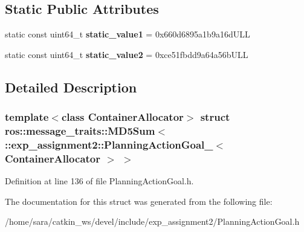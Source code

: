 \subsection*{Static Public Attributes}
\begin{DoxyCompactItemize}
\item 
\mbox{\label{structros_1_1message__traits_1_1MD5Sum_3_01_1_1exp__assignment2_1_1PlanningActionGoal___3_01ContainerAllocator_01_4_01_4_a678332e317450b178f5838aa55084867}} 
static const uint64\+\_\+t {\bfseries static\+\_\+value1} = 0x660d6895a1b9a16d\+U\+LL
\item 
\mbox{\label{structros_1_1message__traits_1_1MD5Sum_3_01_1_1exp__assignment2_1_1PlanningActionGoal___3_01ContainerAllocator_01_4_01_4_aeb93d962b87389bf528a924bf167e149}} 
static const uint64\+\_\+t {\bfseries static\+\_\+value2} = 0xce51fbdd9a64a56b\+U\+LL
\end{DoxyCompactItemize}


\subsection{Detailed Description}
\subsubsection*{template$<$class Container\+Allocator$>$\newline
struct ros\+::message\+\_\+traits\+::\+M\+D5\+Sum$<$ \+::exp\+\_\+assignment2\+::\+Planning\+Action\+Goal\+\_\+$<$ Container\+Allocator $>$ $>$}



Definition at line 136 of file Planning\+Action\+Goal.\+h.



The documentation for this struct was generated from the following file\+:\begin{DoxyCompactItemize}
\item 
/home/sara/catkin\+\_\+ws/devel/include/exp\+\_\+assignment2/Planning\+Action\+Goal.\+h\end{DoxyCompactItemize}
